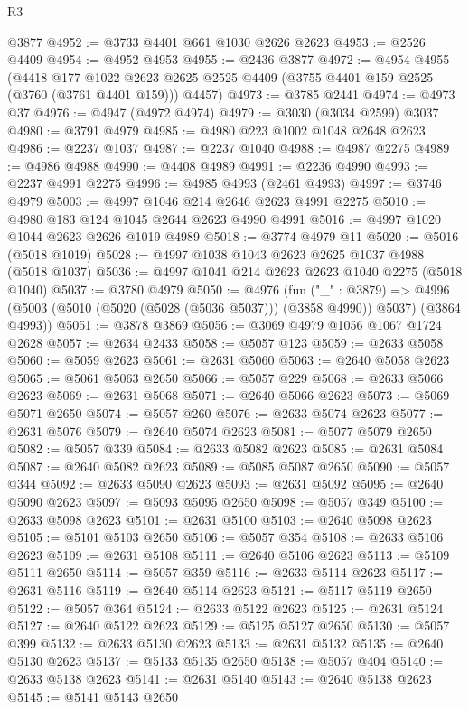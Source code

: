 \begin{lexlean}{R3}
\begin{coremodule}
    @3877
@4952 := @3733 @4401 @661 @1030 @2626 @2623
@4953 := @2526 @4409
@4954 := @4952 @4953
@4955 := @2436 @3877
@4972 := @4954
    @4955
    (@4418
      @177
      @1022
      @2623
      @2625
      @2525
      @4409
      (@3755 @4401 @159 @2525 (@3760 (@3761 @4401 @159)))
      @4457)
@4973 := @3785 @2441
@4974 := @4973 @37
@4976 := @4947 (@4972 @4974)
@4979 := @3030 (@3034 @2599) @3037
@4980 := @3791 @4979
@4985 := @4980 @223 @1002 @1048 @2648 @2623
@4986 := @2237 @1037
@4987 := @2237 @1040
@4988 := @4987 @2275
@4989 := @4986 @4988
@4990 := @4408 @4989
@4991 := @2236 @4990
@4993 := @2237 @4991 @2275
@4996 := @4985 @4993 (@2461 @4993)
@4997 := @3746 @4979
@5003 := @4997 @1046 @214 @2646 @2623 @4991 @2275
@5010 := @4980 @183 @124 @1045 @2644 @2623 @4990 @4991
@5016 := @4997 @1020 @1044 @2623 @2626 @1019 @4989
@5018 := @3774 @4979 @11
@5020 := @5016 (@5018 @1019)
@5028 := @4997 @1038 @1043 @2623 @2625 @1037 @4988 (@5018 @1037)
@5036 := @4997 @1041 @214 @2623 @2623 @1040 @2275 (@5018 @1040)
@5037 := @3780 @4979
@5050 := @4976
    (fun ("_" : @3879) =>
    @4996 (@5003 (@5010 (@5020 (@5028 (@5036 @5037))) (@3858 @4990)) @5037) (@3864 @4993))
@5051 := @3878 @3869
@5056 := @3069 @4979 @1056 @1067 @1724 @2628
@5057 := @2634 @2433
@5058 := @5057 @123
@5059 := @2633 @5058
@5060 := @5059 @2623
@5061 := @2631 @5060
@5063 := @2640 @5058 @2623
@5065 := @5061 @5063 @2650
@5066 := @5057 @229
@5068 := @2633 @5066 @2623
@5069 := @2631 @5068
@5071 := @2640 @5066 @2623
@5073 := @5069 @5071 @2650
@5074 := @5057 @260
@5076 := @2633 @5074 @2623
@5077 := @2631 @5076
@5079 := @2640 @5074 @2623
@5081 := @5077 @5079 @2650
@5082 := @5057 @339
@5084 := @2633 @5082 @2623
@5085 := @2631 @5084
@5087 := @2640 @5082 @2623
@5089 := @5085 @5087 @2650
@5090 := @5057 @344
@5092 := @2633 @5090 @2623
@5093 := @2631 @5092
@5095 := @2640 @5090 @2623
@5097 := @5093 @5095 @2650
@5098 := @5057 @349
@5100 := @2633 @5098 @2623
@5101 := @2631 @5100
@5103 := @2640 @5098 @2623
@5105 := @5101 @5103 @2650
@5106 := @5057 @354
@5108 := @2633 @5106 @2623
@5109 := @2631 @5108
@5111 := @2640 @5106 @2623
@5113 := @5109 @5111 @2650
@5114 := @5057 @359
@5116 := @2633 @5114 @2623
@5117 := @2631 @5116
@5119 := @2640 @5114 @2623
@5121 := @5117 @5119 @2650
@5122 := @5057 @364
@5124 := @2633 @5122 @2623
@5125 := @2631 @5124
@5127 := @2640 @5122 @2623
@5129 := @5125 @5127 @2650
@5130 := @5057 @399
@5132 := @2633 @5130 @2623
@5133 := @2631 @5132
@5135 := @2640 @5130 @2623
@5137 := @5133 @5135 @2650
@5138 := @5057 @404
@5140 := @2633 @5138 @2623
@5141 := @2631 @5140
@5143 := @2640 @5138 @2623
@5145 := @5141 @5143 @2650

\end{coremodule}
\end{lexlean}
